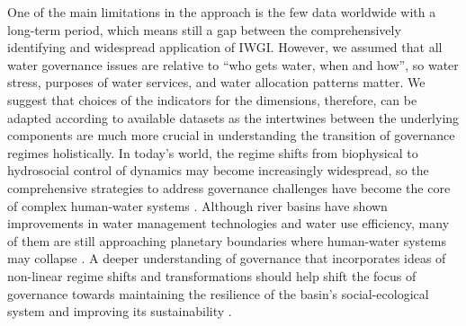 One of the main limitations in the approach is the few data worldwide with a long-term period, which means still a gap between the comprehensively identifying and widespread application of IWGI.
However, we assumed that all water governance issues are relative to ``who gets water, when and how'', so water stress, purposes of water services, and water allocation patterns matter.
We suggest that choices of the indicators for the dimensions, therefore, can be adapted according to available datasets as the intertwines between the underlying components are much more crucial in understanding the transition of governance regimes holistically.
In today's world, the regime shifts from biophysical to hydrosocial control of dynamics may become increasingly widespread, so the comprehensive strategies to address governance challenges have become the core of complex human-water systems
\cite{cumming2018,cumming2014,jaeger2019}.
Although river basins have shown improvements in water management technologies and water use efficiency, many of them are still approaching planetary boundaries where human-water systems may collapse
\cite{gleeson2020, wang-erlandsson2022}.
A deeper understanding of governance that incorporates ideas of non-linear regime shifts and transformations should help shift the focus of governance towards maintaining the resilience of the basin’s social-ecological system and improving its sustainability
\cite{falkenmark2019}.
